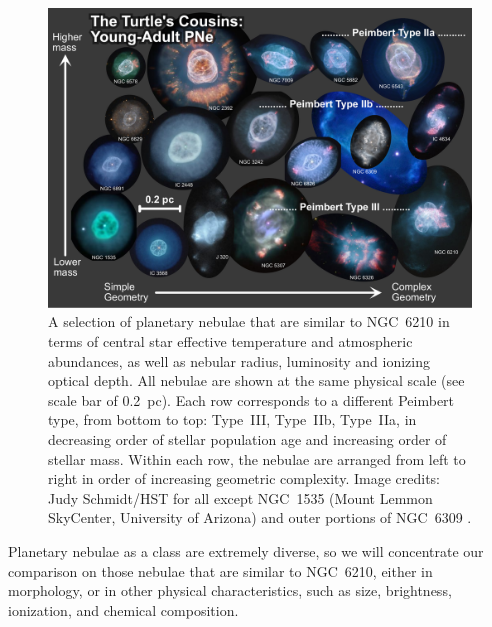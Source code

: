 \documentclass[useAMS, usenatbib]{mnras}
\begin{document}
\begin{figure}
  \centering
  \includegraphics[width=\linewidth]{figs/cousins-of-the-turtle-lores}
  \caption{
    A selection of planetary nebulae that are similar to NGC~6210
    in terms of central star effective temperature and atmospheric abundances,
    as well as nebular radius, luminosity and ionizing optical depth.
    All nebulae are shown at the same physical scale (see scale bar of \SI{0.2}{pc}).
    Each row corresponds to a different Peimbert type, from bottom to top:
    Type~III, Type~IIb, Type~IIa,
    in decreasing order of stellar population age
    and increasing order of stellar mass.
    Within each row, the nebulae are arranged from left to right
    in order of increasing geometric complexity.
    Image credits: Judy Schmidt/HST for all except
    NGC~1535 (Mount Lemmon SkyCenter, University of Arizona)
    and outer portions of NGC~6309 \citep{Rubio:2015a}.
  }
  \label{fig:cousins}
\end{figure}


Planetary nebulae as a class are extremely diverse,
so we will concentrate our comparison on those nebulae that are similar to NGC~6210,
either in morphology,
or in other physical characteristics, such as size, brightness, ionization,
and chemical composition.
\end{document}
